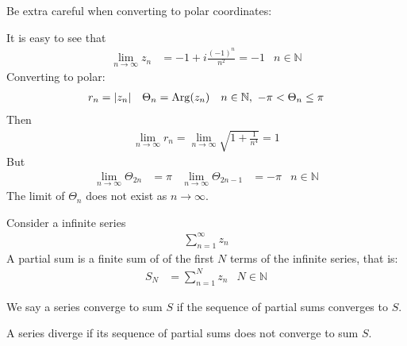 \documentclass[12pt, english]{book}
\begin{document}
	Be extra careful when converting to polar coordinates:
	\begin{example}
		It is easy to see that 
		\begin{align*}
			\lim_{n \rightarrow \infty}
			z_n &= -1 + i \frac{(-1)^n}{n^2} = -1 & n \in \mathbb{N}
		\end{align*}
		Converting to polar: 
		\begin{align*}
			r_n &= \abs{z_n} & \Theta_n &= \operatorname{Arg}(z_n) 
				& n \in \mathbb{N}, \ -\pi < \Theta_n \leq \pi
		\end{align*}
		Then 
		\begin{align*}
			\lim_{n \rightarrow \infty} r_n = \lim_{n \rightarrow \infty} \sqrt{1 + \frac{1}{n^4}} = 1
		\end{align*}
		But
		\begin{align*}
			\lim_{n \rightarrow \infty} \Theta_{2n} &= \pi &
			\lim_{n \rightarrow \infty} \Theta_{2n-1} &= -\pi
				& n \in \mathbb{N}
		\end{align*}
		The limit of \(\Theta_n\) does not exist as \(n \rightarrow \infty\).
	\end{example}

	\begin{definition}
		\label{Partial Sum (Series) Definition - Complex}
		Consider a infinite series
		\begin{align*}
			\sum_{n=1}^{\infty} z_n
		\end{align*}
		A partial sum is a finite sum of of the first \(N\) terms of the infinite series, that is:
		\begin{align*}
			S_N &= \sum_{n=1}^{N} z_n & N \in \mathbb{N}
		\end{align*}
	\end{definition}
	
	\begin{definition}
		We say a series converge to sum \(S\) if the sequence of partial sums converges to \(S\).
	\end{definition}

	\begin{definition}
		A series diverge if its sequence of partial sums does not converge to sum \(S\).
	\end{definition}
	
\end{document}
